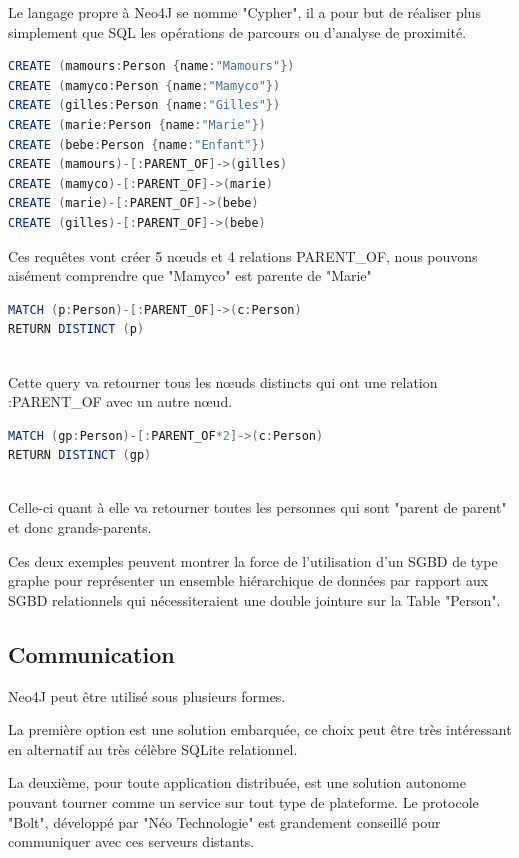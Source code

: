 \documentclass[a4paper,fleqn,12pt]{report}
\begin{document}
Le langage propre à Neo4J se nomme "Cypher"\label{Cypher}, il a pour but de réaliser plus simplement que SQL les opérations de parcours ou d'analyse de proximité.

\begin{lstlisting}[language=java, frame=single]
CREATE (mamours:Person {name:"Mamours"})
CREATE (mamyco:Person {name:"Mamyco"})
CREATE (gilles:Person {name:"Gilles"})
CREATE (marie:Person {name:"Marie"})
CREATE (bebe:Person {name:"Enfant"})
CREATE (mamours)-[:PARENT_OF]->(gilles)
CREATE (mamyco)-[:PARENT_OF]->(marie)
CREATE (marie)-[:PARENT_OF]->(bebe)
CREATE (gilles)-[:PARENT_OF]->(bebe)
\end{lstlisting}

Ces requêtes vont créer 5 nœuds et 4 relations PARENT\_OF, nous pouvons aisément comprendre que "Mamyco" est parente de "Marie"

\begin{lstlisting}[language=java, frame=single]
MATCH (p:Person)-[:PARENT_OF]->(c:Person) 
RETURN DISTINCT (p)
	
\end{lstlisting}

Cette query va retourner tous les nœuds distincts qui ont une relation :PARENT\_OF avec un autre nœud.

\begin{lstlisting}[language=java, frame=single]
MATCH (gp:Person)-[:PARENT_OF*2]->(c:Person) 
RETURN DISTINCT (gp)
	
\end{lstlisting}

Celle-ci quant à elle va retourner toutes les personnes qui sont "parent de parent" et donc grands-parents. 

Ces deux exemples peuvent montrer la force de l’utilisation d’un SGBD de type graphe pour représenter un ensemble hiérarchique de données par rapport aux SGBD relationnels qui nécessiteraient une double jointure sur la Table "Person".

\subsection{Communication}

Neo4J peut être utilisé sous plusieurs formes.

La première option est une solution embarquée, ce choix peut être très intéressant en alternatif au très célèbre SQLite relationnel.

La deuxième, pour toute application distribuée, est une solution autonome pouvant tourner comme un service sur tout type de plateforme. Le protocole "Bolt", développé par "Néo Technologie" est grandement conseillé pour communiquer avec ces serveurs distants.
\end{document}
